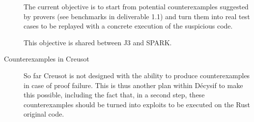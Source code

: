 \documentclass[a4paper,11pt]{article}
\begin{document}
\begin{description}
  The current objective is to start from potential counterexamples suggested by
  provers (see benchmarks in deliverable 1.1) and turn them into real test cases
  to be replayed with a concrete execution of the suspicious code.

  This objective is shared between J3 and SPARK.

\item[Counterexamples in Creusot]

  So far Creusot is not designed with the ability to produce counterexamples in
  case of proof failure. This is thus another plan within Décysif to make this
  possible, including the fact that, in a second step, these counterexamples
  should be turned into exploits to be executed on the Rust original code.

\end{description}


%


\end{document}

